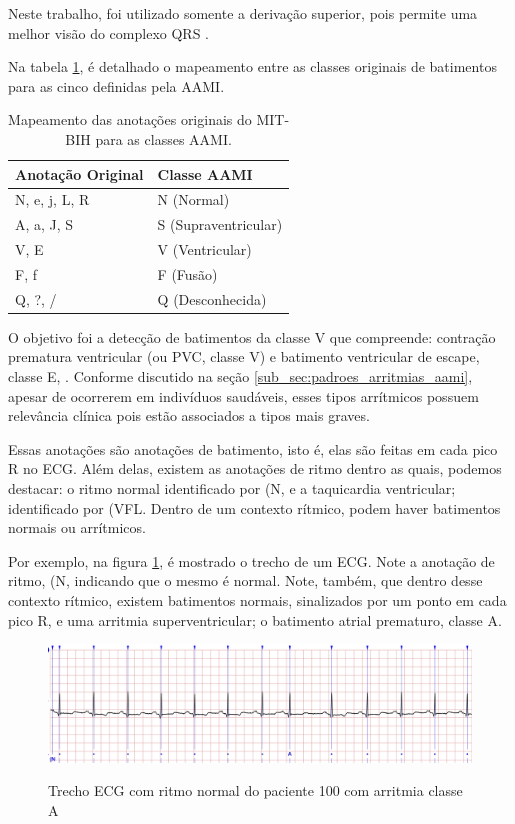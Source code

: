 Neste trabalho, foi utilizado somente a derivação superior, pois permite uma melhor visão do complexo QRS \cite{physionet_annotations}.

Na tabela \ref{tab:mapeamento_classes}, é detalhado o mapeamento entre as classes originais de batimentos para as cinco definidas pela AAMI.

\begin{table}[H]
\centering
\caption{Mapeamento das anotações originais do MIT-BIH para as classes AAMI.}
\label{tab:mapeamento_classes}
\begin{tabular}{ll}
\hline
\textbf{Anotação Original} & \textbf{Classe AAMI} \\
\hline
N, e, j, L, R & N (Normal) \\
A, a, J, S & S (Supraventricular) \\
V, E & V (Ventricular) \\
F, f & F (Fusão) \\
Q, ?, / & Q (Desconhecida) \\
\hline
\end{tabular}
\end{table}

O objetivo foi a detecção de batimentos da classe V que compreende: contração prematura ventricular (ou PVC, classe V) e batimento ventricular de escape, classe E, \cite{physionet_annotations}.
Conforme discutido na seção \ref{sub_sec:padroes_arritmias_aami}, apesar de ocorrerem em indivíduos saudáveis, esses tipos arrítmicos possuem relevância clínica pois estão associados a tipos mais graves.

Essas anotações são anotações de batimento, isto é, elas são feitas em cada pico R no ECG. Além delas, existem as anotações de ritmo dentro as quais, podemos destacar: o ritmo normal identificado por (N,
e a taquicardia ventricular; identificado por (VFL. Dentro de um contexto rítmico, podem haver batimentos normais ou arrítmicos.

Por exemplo, na figura \ref{fig:p100_ritmo_normal}, é mostrado o trecho de um ECG. Note a anotação de ritmo, (N, indicando que o mesmo 
é normal. Note, também, que dentro desse contexto rítmico, existem batimentos normais, sinalizados por um ponto em cada pico R, e uma arritmia superventricular; 
o batimento atrial prematuro, classe A.

\begin{figure}[H]
  \centering
  \caption{Trecho ECG com ritmo normal do paciente 100 com arritmia classe A}
  \includegraphics[width=\linewidth]{figuras/ecg_physio_bank/p100_ritmo_normal.png}  %
  \label{fig:p100_ritmo_normal}
\end{figure}

